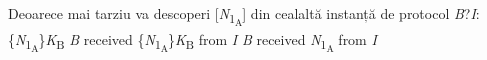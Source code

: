 \documentclass{beamer}[10]
\begin{document}
{\begin{Parallel}[v]{0.48\textwidth}{0.48\textwidth}
{                Deoarece mai tarziu va descoperi [\textit{N}\textsubscript{1\textsubscript{A}}] din cealaltă instanță de protocol\newline 
\newline\textit{B}?\textit{I}:\{\textit{N}\textsubscript{1\textsubscript{A}}\}\textit{K}\textsubscript{B}\newline 
\textit{B} received \{\textit{N}\textsubscript{1\textsubscript{A}}\}\textit{K}\textsubscript{B} from \textit{I}\newline 
\textit{B} received \textit{N}\textsubscript{1\textsubscript{A}} from \textit{I}\newline 
}
\ParallelPar
\end{Parallel}
}

\end{document}
